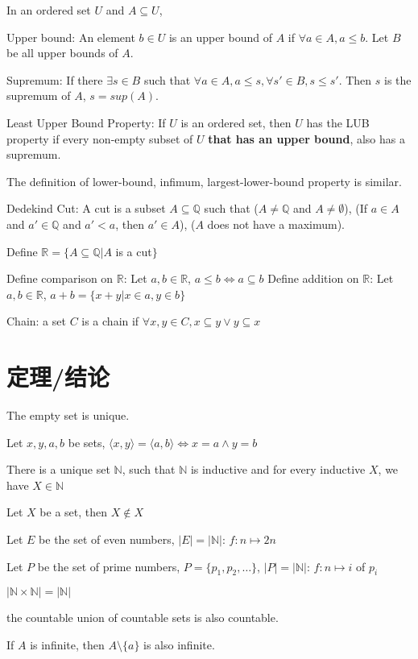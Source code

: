 \documentclass[12pt,a4paper]{ctexrep}
\begin{document}
In an ordered set $U$ and $A \subseteq U$,

Upper bound: An element $b \in U$ is an upper bound of $A$ if $\forall a \in A, a \leqslant b$. Let $B$ be all upper bounds of $A$.

Supremum: If there $\exists s \in B$ such that $\forall a \in A, a \leqslant s, \forall s' \in B, s \leqslant s'$. Then $s$ is the supremum of $A$, $s = sup(A)$.

Least Upper Bound Property: If $U$ is an ordered set, then $U$ has the LUB property if every non-empty subset of $U$ \textbf{that has an upper bound}, also has a supremum.

The definition of lower-bound, infimum, largest-lower-bound property is similar.

Dedekind Cut: A cut is a subset $A \subseteq \mathbb{Q}$ such that ($A \neq \mathbb{Q}$ and $A \neq \emptyset$), (If $a \in A$ and $a' \in \mathbb{Q}$ and $a' < a$, then $a' \in A$), ($A$ does not have a maximum).

Define $\mathbb{R} = \{A \subseteq \mathbb{Q}|A$ is a cut$\}$

Define comparison on $\mathbb{R}$: Let $a,b \in \mathbb{R}$, $a \leqslant b \iff a \subseteq b$
Define addition on $\mathbb{R}$: Let $a,b \in \mathbb{R}$, $a+b = \{x+y|x \in a, y \in b\}$

Chain: a set $C$ is a chain if $\forall x,y \in C, x \subseteq y \vee y \subseteq x$
\section{定理/结论}
The empty set is unique.

Let $x,y,a,b$ be sets, $\langle x,y \rangle = \langle a,b \rangle \iff x=a \wedge y=b$

There is a unique set $\mathbb{N}$, such that $\mathbb{N}$ is inductive and for every inductive $X$, we have $X\in \mathbb{N}$

Let $X$ be a set, then $X \notin X$

Let $E$ be the set of even numbers, $|E|=|\mathbb{N}|$: $f:n\mapsto 2n$

Let $P$ be the set of prime numbers, $P=\{p_1,p_2,\dots\}$, $|P|=|\mathbb{N}|$: $f:n \mapsto i$ of $p_i$

$|\mathbb{N} \times \mathbb{N}| = |\mathbb{N}|$

the countable union of countable sets is also countable.

If $A$ is infinite, then $A\setminus \{a\}$ is also infinite.
\end{document}
